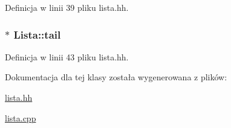 Definicja w linii 39 pliku lista.\-hh.

\hypertarget{class_lista_a7d42e5f99e945d97c29d6f764f71f4e7}{
\subsubsection[{tail}]{$\ast$ Lista\-::tail\hspace{0.3cm}{\ttfamily [private]}}}\label{class_lista_a7d42e5f99e945d97c29d6f764f71f4e7}


Definicja w linii 43 pliku lista.\-hh.



Dokumentacja dla tej klasy została wygenerowana z plików\-:\begin{DoxyCompactItemize}
\item 
\hyperlink{lista_8hh}{lista.\-hh}\item 
\hyperlink{lista_8cpp}{lista.\-cpp}\end{DoxyCompactItemize}
